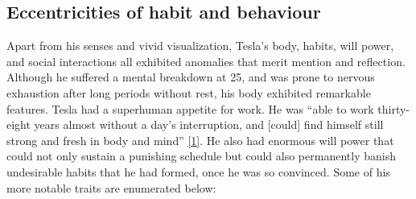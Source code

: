 \documentclass[
  a4paper,
]{article}
\begin{document}
\hypertarget{eccentricities-of-habit-and-behaviour}{%
\subsection{Eccentricities of habit and
behaviour}\label{eccentricities-of-habit-and-behaviour}}

Apart from his senses and vivid visualization, Tesla's body, habits,
will power, and social interactions all exhibited anomalies that merit
mention and reflection. Although he suffered a mental breakdown at 25,
and was prone to nervous exhaustion after long periods without rest, his
body exhibited remarkable features. Tesla had a superhuman appetite for
work. He was ``able to work thirty-eight years almost without a day's
interruption, and {[}could{]} find himself still strong and fresh in
body and mind'' \protect\hyperlink{ref-john83}{{[}1{]}}. He also had
enormous will power that could not only sustain a punishing schedule but
could also permanently banish undesirable habits that he had formed,
once he was so convinced. Some of his more notable traits are enumerated
below:
\end{document}
